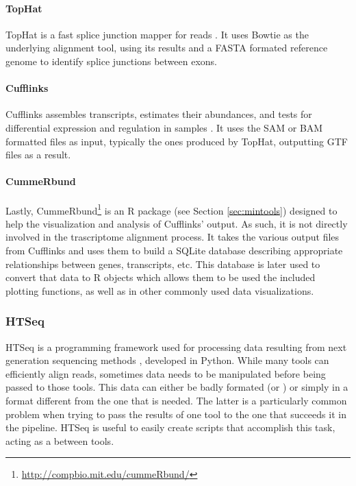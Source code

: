\paragraph{TopHat}

TopHat is a fast splice junction mapper for \rnaseq{} reads
\cite{Trapnell01052009}. It uses Bowtie as the underlying alignment tool, using
its results and a FASTA formated reference genome to identify splice junctions
between exons.

\paragraph{Cufflinks}

Cufflinks assembles transcripts, estimates their abundances, and tests for
differential expression and regulation in \rnaseq{} samples
\cite{trapnell2010transcript}. It uses the SAM or BAM formatted files as input,
typically the ones produced by TopHat, outputting GTF files as a result.

\paragraph{CummeRbund}

Lastly, CummeRbund\footnote{\url{http://compbio.mit.edu/cummeRbund/}} is an R
package (see Section \ref{sec:mintools}) designed to help the visualization and
analysis of Cufflinks' \rnaseq{} output. As such, it is not directly involved in
the trascriptome alignment process. It takes the various output files from
Cufflinks and uses them to build a SQLite database describing appropriate
relationships between genes, transcripts, etc. This database is later used to
convert that data to R objects which allows them to be used the included
plotting functions, as well as in other commonly used data visualizations.

\subsubsection*{HTSeq}

HTSeq is a programming framework used for processing data resulting from next
generation sequencing methods \cite{htseq}, developed in Python. While many
tools can efficiently align reads, sometimes data needs to be manipulated before
being passed to those tools. This data can either be badly formated (or
) or simply in a format different from the one that is needed. The
latter is a particularly common problem when trying to pass the results of one
tool to the one that succeeds it in the pipeline. HTSeq is useful to easily
create scripts that accomplish this task, acting as a  between tools.

